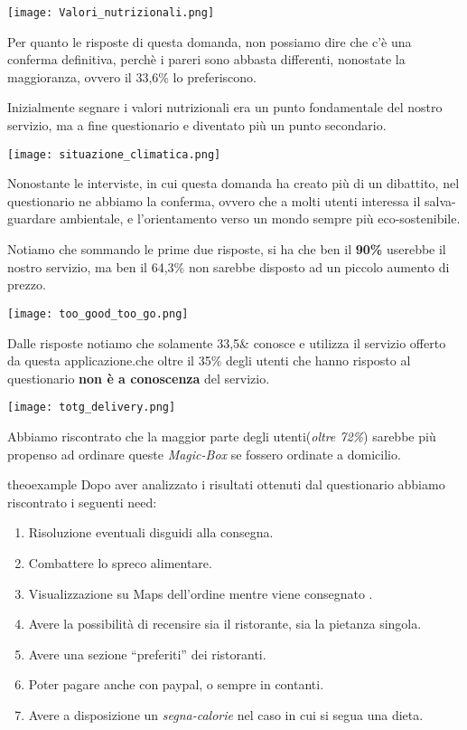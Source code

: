\documentclass{article}
\begin{document}
    \par \vspace{1cm}
\texttt{[image: Valori\_nutrizionali.png]}\par
Per quanto le risposte di questa domanda, non possiamo dire che c'è una conferma definitiva, perchè i pareri sono abbasta differenti, nonostate la maggioranza, ovvero il 33,6\% lo preferiscono. \par
Inizialmente segnare i valori nutrizionali era un punto fondamentale del nostro servizio, ma a fine questionario e diventato più un punto secondario.\par \vspace{1cm}
\texttt{[image: situazione\_climatica.png]}\par
Nonostante le interviste, in cui questa domanda ha creato più di un dibattito, nel questionario ne abbiamo la conferma, ovvero che a molti utenti interessa il salva-guardare ambientale, e l'orientamento verso un mondo sempre più eco-sostenibile.\par Notiamo che sommando le prime due risposte, si ha che ben il \textbf{90\%} userebbe il nostro servizio, ma ben il 64,3\% non sarebbe disposto ad un piccolo aumento di prezzo. \par \vspace{1cm}
\texttt{[image: too\_good\_too\_go.png]}\par
Dalle risposte notiamo che solamente 33,5\& conosce e utilizza il servizio offerto da questa applicazione.\parVediamo che oltre il 35\% degli utenti che hanno risposto al questionario \textbf{non è a conoscenza} del servizio.\par \vspace{1cm}
\texttt{[image: totg\_delivery.png]} \par
Abbiamo riscontrato che la maggior parte degli utenti(\textit{oltre 72\%}) sarebbe più propenso ad ordinare queste \textit{Magic-Box} se fossero ordinate a domicilio.
\begin{need}{}{theoexample}
    Dopo aver analizzato i risultati ottenuti dal questionario abbiamo riscontrato i seguenti need:
    \begin{enumerate}
        \item Risoluzione eventuali disguidi alla consegna.
        \item Combattere lo spreco alimentare.
        \item Visualizzazione su Maps dell'ordine mentre viene consegnato .
        \item Avere la possibilità di recensire sia il ristorante, sia la pietanza singola.
        \item Avere una sezione “preferiti” dei ristoranti.
        \item Poter pagare anche con paypal, o sempre in contanti.
        \item Avere a disposizione un \textit{segna-calorie} nel caso in cui si segua una dieta.
    \end{enumerate}
    \end{need}
\end{document}
